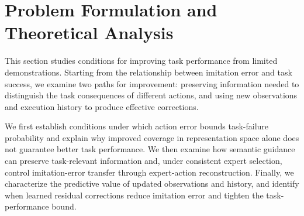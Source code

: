\section{Problem Formulation and Theoretical Analysis}
\label{sec:analysis}

This section studies conditions for improving task performance from limited demonstrations. 
Starting from the relationship between imitation error and task success, we examine two paths for improvement: 
preserving information needed to distinguish the task consequences of different actions, 
and using new observations and execution history to produce effective corrections. 

We first establish conditions under which action error bounds task-failure probability 
and explain why improved coverage in representation space alone does not guarantee better task performance. 
We then examine how semantic guidance can preserve task-relevant information
and, under consistent expert selection, control imitation-error transfer through expert-action reconstruction.
Finally, we characterize the predictive value of updated observations and history,
and identify when learned residual corrections reduce imitation error and tighten the task-performance bound.





